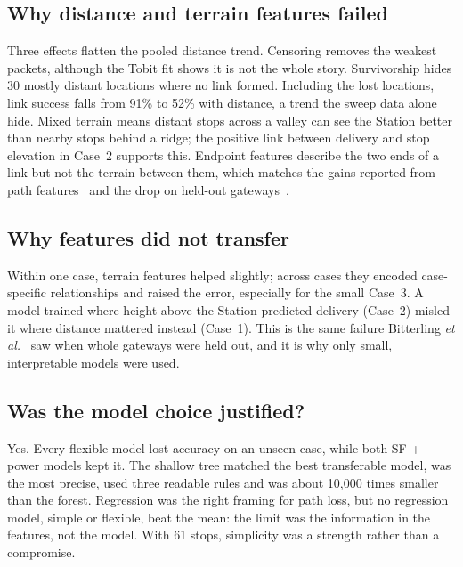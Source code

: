\documentclass[conference]{IEEEtran}
\begin{document}
\subsection{Why distance and terrain features failed}
Three effects flatten the pooled distance trend. Censoring removes the weakest packets, although the Tobit fit shows it is not the whole story. Survivorship hides 30 mostly distant locations where no link formed. Including the lost locations, link success falls from 91\% to 52\% with distance, a trend the sweep data alone hide. Mixed terrain means distant stops across a valley can see the Station better than nearby stops behind a ridge; the positive link between delivery and stop elevation in Case~2 supports this. Endpoint features describe the two ends of a link but not the terrain between them, which matches the gains reported from path features~\cite{ojo2024,ethier2024} and the drop on held-out gateways~\cite{bitterling2026}.

\subsection{Why features did not transfer}
Within one case, terrain features helped slightly; across cases they encoded case-specific relationships and raised the error, especially for the small Case~3. A model trained where height above the Station predicted delivery (Case~2) misled it where distance mattered instead (Case~1). This is the same failure Bitterling \textit{et al.}~\cite{bitterling2026} saw when whole gateways were held out, and it is why only small, interpretable models were used.

\subsection{Was the model choice justified?}
Yes. Every flexible model lost accuracy on an unseen case, while both SF + power models kept it. The shallow tree matched the best transferable model, was the most precise, used three readable rules and was about 10,000 times smaller than the forest. Regression was the right framing for path loss, but no regression model, simple or flexible, beat the mean: the limit was the information in the features, not the model. With 61 stops, simplicity was a strength rather than a compromise.
\end{document}
